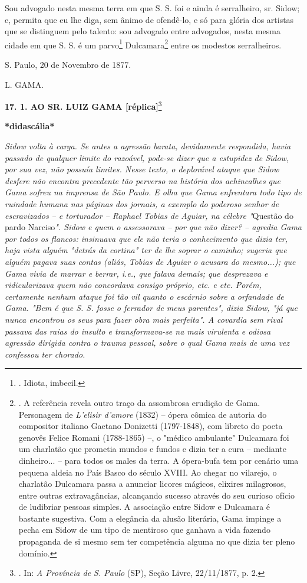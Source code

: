 Sou advogado nesta mesma terra em que S. S. foi e ainda é serralheiro,
sr. Sidow; e, permita que eu lhe diga, sem ânimo de ofendê-lo, e só para
glória dos artistas que se distinguem pelo talento: sou advogado entre
advogados, nesta mesma cidade em que S. S. é um parvo\footnote{. Idiota,
  imbecil.} Dulcamara\footnote{. A referência revela outro traço da
  assombrosa erudição de Gama. Personagem de \emph{L'elisir d'amore}
  (1832) -- ópera cômica de autoria do compositor italiano Gaetano
  Donizetti (1797-1848), com libreto do poeta genovês Felice Romani
  (1788-1865) --, o "médico ambulante" Dulcamara foi um charlatão que
  prometia mundos e fundos e dizia ter a cura -- mediante dinheiro... --
  para todos os males da terra. A ópera-bufa tem por cenário uma pequena
  aldeia no País Basco do século XVIII. Ao chegar no vilarejo, o
  charlatão Dulcamara passa a anunciar licores mágicos, elixires
  milagrosos, entre outras extravagâncias, alcançando sucesso através do
  seu curioso ofício de ludibriar pessoas simples. A associação entre
  Sidow e Dulcamara é bastante sugestiva. Com a elegância da alusão
  literária, Gama impinge a pecha em Sidow de um tipo de mentiroso que
  ganhava a vida fazendo propaganda de si mesmo sem ter competência
  alguma no que dizia ter pleno domínio.}
entr\protect\hypertarget{Secao_Sem_Titulo-24}{}{}e os modestos
serralheiros.

S. Paulo, 20 de Novembro de 1877.

L. GAMA.

\textbf{17. 1. AO SR. LUIZ GAMA {[}réplica{]}}\footnote{. In: \emph{A
  Província de S. Paulo} (SP), Seção Livre, 22/11/1877, p. 2.}

\textbf{*didascália*}

\emph{Sidow volta à carga. Se antes a agressão barata, devidamente
respondida, havia passado de qualquer limite do razoável, pode-se dizer
que a estupidez de Sidow, por sua vez, não possuía limites. Nesse texto,
o deplorável ataque que Sidow desfere não encontra precedente tão
perverso na história dos achincalhes que Gama sofreu na imprensa de São
Paulo. E olha que Gama enfrentara todo tipo de ruindade humana nas
páginas dos jornais, a exemplo do poderoso senhor de escravizados -- e
torturador -- Raphael Tobias de Aguiar, na célebre "}Questão do pardo
Narciso\emph{". Sidow e quem o assessorava -- por que não dizer? --
agredia Gama por todos os flancos: insinuava que ele não teria o
conhecimento que dizia ter, haja vista alguém "detrás da cortina" ter de
lhe soprar o caminho; sugeria que alguém pagava suas contas (aliás,
Tobias de Aguiar o acusara do mesmo...); que Gama vivia de marrar e
berrar, i.e., que falava demais; que desprezava e ridicularizava quem
não concordava consigo próprio, etc. e etc. Porém, certamente nenhum
ataque foi tão vil quanto o escárnio sobre a orfandade de Gama. "Bem é
que S. S. fosse o ferrador de meus parentes", dizia Sidow, "já que nunca
encontrou os seus para fazer obra mais perfeita". A covardia sem rival
passava das raias do insulto e transformava-se na mais virulenta e
odiosa agressão dirigida contra o trauma pessoal, sobre o qual Gama mais
de uma vez confessou ter chorado. }

